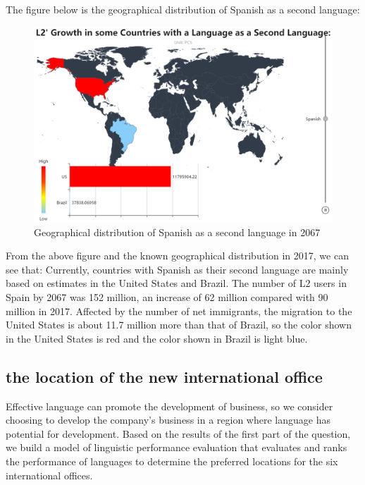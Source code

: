 \par The figure below is the geographical distribution of Spanish as a second language:

\begin{figure}[h]
	\centering
	\includegraphics[width=1\linewidth]{figures/Spanish}
	\caption{Geographical distribution of Spanish as a second language in 2067}
	\label{fig:spanish}
\end{figure}

\par From the above figure and the known geographical distribution in 2017, we can see that: Currently, countries with Spanish as their second language are mainly based on estimates in the United States and Brazil. The number of L2 users in Spain by 2067 was 152 million, an increase of 62 million compared with 90 million in 2017. Affected by the number of net immigrants, the migration to the United States is about 11.7 million more than that of Brazil, so the color shown in the United States is red and the color shown in Brazil is light blue. 

\subsection{the location of the new international office}

\noindent Effective language can promote the development of business, so we consider choosing to develop the company's business in a region where language has potential for development. Based on the results of the first part of the question, we build a model of linguistic performance evaluation that evaluates and ranks the performance of languages to determine the preferred locations for the six international offices.

